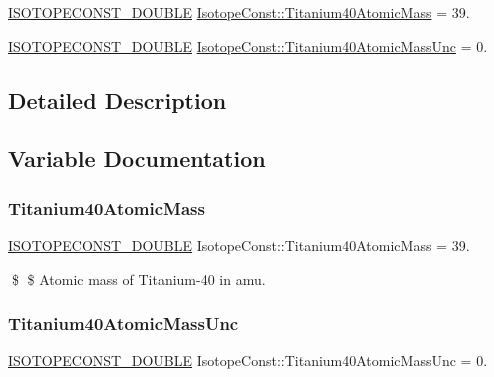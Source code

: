 \begin{DoxyCompactItemize}
\item 
\mbox{\hyperlink{group___isotope_const-_macros_ga8f45a7272ce02c0b4c65c44636ed719a}{I\+S\+O\+T\+O\+P\+E\+C\+O\+N\+S\+T\+\_\+\+D\+O\+U\+B\+LE}} \mbox{\hyperlink{group___isotope_const-_titanium-_ti40_ga159b8f5d1682ff6609cac4fd42463980}{Isotope\+Const\+::\+Titanium40\+Atomic\+Mass}} = 39.
\item 
\mbox{\hyperlink{group___isotope_const-_macros_ga8f45a7272ce02c0b4c65c44636ed719a}{I\+S\+O\+T\+O\+P\+E\+C\+O\+N\+S\+T\+\_\+\+D\+O\+U\+B\+LE}} \mbox{\hyperlink{group___isotope_const-_titanium-_ti40_ga247f3c1cdafd51de4ff548ba0d6699f6}{Isotope\+Const\+::\+Titanium40\+Atomic\+Mass\+Unc}} = 0.
\end{DoxyCompactItemize}


\subsection{Detailed Description}


\subsection{Variable Documentation}
\mbox{\label{group___isotope_const-_titanium-_ti40_ga159b8f5d1682ff6609cac4fd42463980}} 
\subsubsection{\texorpdfstring{Titanium40\+Atomic\+Mass}{Titanium40AtomicMass}}
{\footnotesize\ttfamily \mbox{\hyperlink{group___isotope_const-_macros_ga8f45a7272ce02c0b4c65c44636ed719a}{I\+S\+O\+T\+O\+P\+E\+C\+O\+N\+S\+T\+\_\+\+D\+O\+U\+B\+LE}} Isotope\+Const\+::\+Titanium40\+Atomic\+Mass = 39.}

\$ \$ Atomic mass of Titanium-\/40 in amu. \mbox{\label{group___isotope_const-_titanium-_ti40_ga247f3c1cdafd51de4ff548ba0d6699f6}} 
\subsubsection{\texorpdfstring{Titanium40\+Atomic\+Mass\+Unc}{Titanium40AtomicMassUnc}}
{\footnotesize\ttfamily \mbox{\hyperlink{group___isotope_const-_macros_ga8f45a7272ce02c0b4c65c44636ed719a}{I\+S\+O\+T\+O\+P\+E\+C\+O\+N\+S\+T\+\_\+\+D\+O\+U\+B\+LE}} Isotope\+Const\+::\+Titanium40\+Atomic\+Mass\+Unc = 0.}

